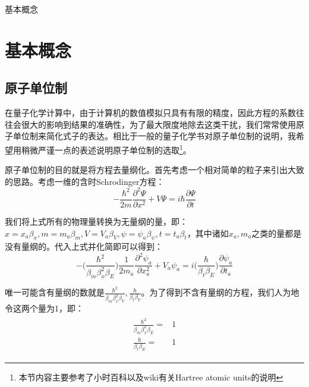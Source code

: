 \begin{introduction}
    \item 基本概念
\end{introduction}

\section{基本概念}
    \subsection{原子单位制}
        在量子化学计算中，由于计算机的数值模拟只具有有限的精度，因此方程的系数往往会很大的影响到结果的准确性，为了最大限度地除去这类干扰，我们常常使用原子单位制来简化式子的表达。相比于一般的量子化学书对原子单位制的说明，我希望用稍微严谨一点的表述说明原子单位制的选取\footnote{本节内容主要参考了小时百科以及wiki有关Hartree atomic units的说明}。
        
        原子单位制的目的就是将方程去量纲化。首先考虑一个相对简单的粒子来引出大致的思路。考虑一维的含时Schrodinger方程：
        \begin{equation}
            -\frac{\hbar^2}{2m}\frac{\partial^2\Psi}{\partial x^2}+V\Psi=i\hbar \frac{\partial \Psi}{\partial t}
        \end{equation}
        
        我们将上式所有的物理量转换为无量纲的量，即：$x=x_a\beta_x,m=m_a\beta_m,V=V_a\beta_V,\psi=\psi_a\beta_{\psi},t=t_a\beta_t$，其中诸如$x_a,m_a$之类的量都是没有量纲的。代入上式并化简即可以得到：
        \begin{equation}
            -\Big(\frac{\hbar^2}{\beta_m\beta_x^2\beta_E}\Big)\frac{1}{2m_a}\frac{\partial^2\psi_a}{\partial x_a^2}+V_a\psi_a=i\Big(\frac{\hbar}{\beta_t\beta_E}\Big)\frac{\partial\psi_a}{\partial t_a}
        \end{equation}
        
        唯一可能含有量纲的数就是$\frac{\hbar^2}{\beta_m\beta_x^2\beta_V},\frac{\hbar}{\beta_t\beta_V}$。为了得到不含有量纲的方程，我们人为地令这两个量为1，即：
        \begin{align}\label{equ12:restrictA}
            \begin{split}
                \frac{\hbar^2}{\beta_m\beta_x^2\beta_E}=&1\\
                \frac{\hbar}{\beta_t\beta_E}=&1
            \end{split}
        \end{align}
        
